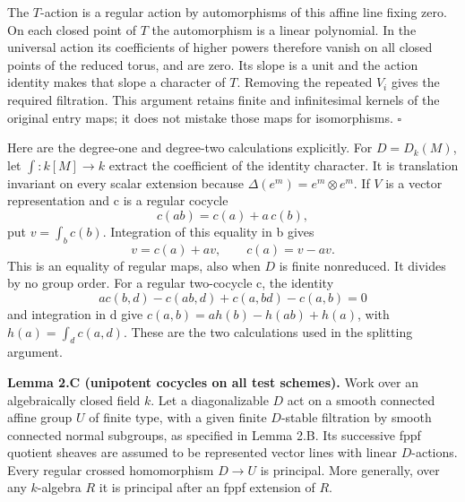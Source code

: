 \documentclass[11pt,a4paper,openany]{report}
\begin{document}
The \(T\)-action is a regular action by automorphisms of this affine line fixing zero. On each closed point of \(T\) the automorphism is a linear polynomial. In the universal action its coefficients of higher powers therefore vanish on all closed points of the reduced torus, and are zero. Its slope is a unit and the action identity makes that slope a character of \(T\). Removing the repeated \(V_i\) gives the required filtration. This argument retains finite and infinitesimal kernels of the original entry maps; it does not mistake those maps for isomorphisms. \(\square\)

Here are the degree-one and degree-two calculations explicitly. For \(D=D_k(M)\), let \(\int:k[M]\to k\) extract the coefficient of the identity character. It is translation invariant on every scalar extension because \(\Delta(e^m)=e^m\otimes e^m\). If \(V\) is a vector representation and c is a regular cocycle \[
c(ab)=c(a)+a\,c(b),
\] put \(v=\int_b c(b)\). Integration of this equality in b gives \[
v=c(a)+a v,\qquad c(a)=v-a v.
\] This is an equality of regular maps, also when \(D\) is finite nonreduced. It divides by no group order. For a regular two-cocycle c, the identity \[
a c(b,d)-c(ab,d)+c(a,bd)-c(a,b)=0
\] and integration in d give \(c(a,b)=a h(b)-h(ab)+h(a)\), with \(h(a)=\int_d c(a,d)\). These are the two calculations used in the splitting argument.

\textbf{Lemma 2.C (unipotent cocycles on all test schemes).} Work over an algebraically closed field \(k\). Let a diagonalizable \(D\) act on a smooth connected affine group \(U\) of finite type, with a given finite \(D\)-stable filtration by smooth connected normal subgroups, as specified in Lemma 2.B. Its successive fppf quotient sheaves are assumed to be represented vector lines with linear \(D\)-actions. Every regular crossed homomorphism \(D\to U\) is principal. More generally, over any \(k\)-algebra \(R\) it is principal after an fppf extension of \(R\).
\end{document}
